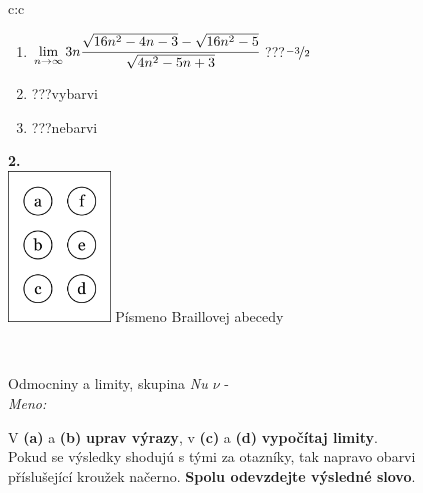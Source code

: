 \documentclass[10pt]{report}
\begin{document}
\begin{tabular}{c:c}
\begin{minipage}[c][104.5mm][t]{0.5\linewidth}
\begin{center}
\begin{minipage}{0.79\linewidth}
\begin{center}
\begin{varwidth}{\linewidth}
\begin{enumerate}
\item $\lim\limits_{n\to\infty}3n\cfrac{\sqrt{16n^2-4n-3}-\sqrt{16n^2-5}}{\sqrt{4n^2-5n+3}}$\quad \dotfill\; ???\;\dotfill \quad $\nicefrac{-3}{2}$
\item \quad \dotfill\; ???\;\dotfill \quad vybarvi
\item \quad \dotfill\; ???\;\dotfill \quad nebarvi
\end{enumerate}
\end{varwidth}
\end{center}
\end{minipage}
\begin{minipage}{0.20\linewidth}
\begin{center}
{\Huge\bfseries 2.} \\[2mm]
\includegraphics[height=40mm]{../images/braille.png}
{\small Písmeno Braillovej abecedy}
\end{center}
\end{minipage}
\end{center}
\end{minipage}
\\ \hdashline
\begin{minipage}[c][104.5mm][t]{0.5\linewidth}
\begin{center}
\vspace{7mm}
{\huge Odmocniny a limity, skupina \textit{Nu $\nu$} -}\\[5mm]
\textit{Meno:}\phantom{xxxxxxxxxxxxxxxxxxxxxxxxxxxxxxxxxxxxxxxxxxxxxxxxxxxxxxxxxxxxxxxxx}\\[5mm]
\begin{minipage}{0.95\linewidth}
\begin{center}
V \textbf{(a)} a \textbf{(b)} \textbf{uprav výrazy}, v \textbf{(c)} a \textbf{(d)} \textbf{vypočítaj limity}.\\Pokud se výsledky shodujú s tými za otazníky, tak napravo obarvi\\příslušející kroužek načerno. \textbf{Spolu odevzdejte výsledné slovo}.
\end{center}
\end{minipage}
\\[1mm]

\end{center}
\end{minipage}
\end{tabular}
\end{document}

